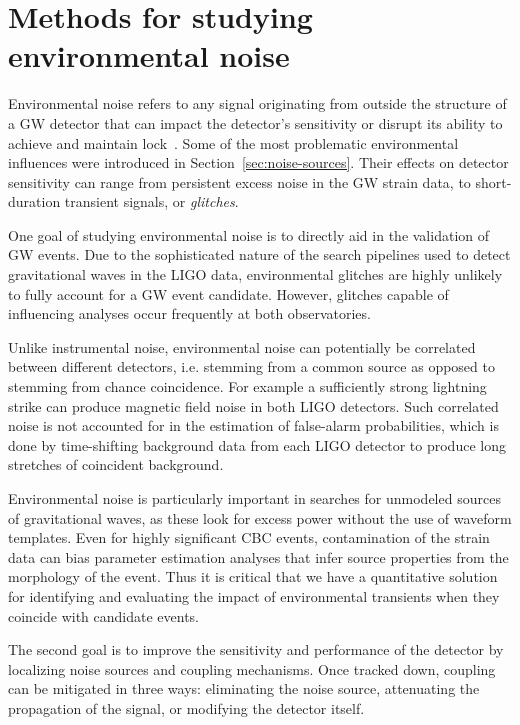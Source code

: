 \chapter{Methods for studying environmental noise}\label{ch:noise-methods}

Environmental noise refers to any signal originating from outside the structure of a \ac{GW} detector that can impact the detector's sensitivity or disrupt its ability to achieve and maintain lock~\citep{Effler_2015,Nguyen_2021}.
Some of the most problematic environmental influences were introduced in Section~\ref{sec:noise-sources}.
Their effects on detector sensitivity can range from persistent excess noise in the \ac{GW} strain data, to short-duration transient signals, or \textit{glitches}.

One goal of studying environmental noise is to directly aid in the validation of \ac{GW} events.
Due to the sophisticated nature of the search pipelines used to detect gravitational waves in the \ac{LIGO} data, environmental glitches are highly unlikely to fully account for a \ac{GW} event candidate.
However, glitches capable of influencing analyses occur frequently at both observatories.

Unlike instrumental noise, environmental noise can potentially be correlated between different detectors, i.e. stemming from a common source as opposed to stemming from chance coincidence.
For example a sufficiently strong lightning strike can produce magnetic field noise in both LIGO detectors.
Such correlated noise is not accounted for in the estimation of false-alarm probabilities, which is done by time-shifting background data from each \ac{LIGO} detector to produce long stretches of coincident background.

Environmental noise is particularly important in searches for unmodeled sources of gravitational waves, as these look for excess power without the use of waveform templates.
Even for highly significant \ac{CBC} events, contamination of the strain data can bias parameter estimation analyses that infer source properties from the morphology of the event.
Thus it is critical that we have a quantitative solution for identifying and evaluating the impact of environmental transients when they coincide with candidate events.

The second goal is to improve the sensitivity and performance of the detector by localizing noise sources and coupling mechanisms. Once tracked down, coupling can be mitigated in three ways: eliminating the noise source, attenuating the propagation of the signal, or modifying the detector itself.

